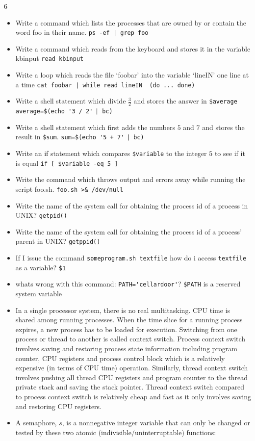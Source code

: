 \documentclass[9pt,landscape]{memoir}
\begin{document}
\begin{multicols}{6}
\begin{itemize}
    \item Write a command which lists the processes that are owned by or contain the word foo in their name. \verb$ps -ef | grep foo$
    \item Write a command which reads from the keyboard and stores it in the variable kbinput \verb$read kbinput$
    \item  Write a loop which reads the file `foobar' into the variable `lineIN' one line at a time
    \verb$cat foobar | while read lineIN  (do ... done)$
    \item Write a shell statement which divide $\frac{3}{2}$ and stores the answer in \verb|$average| \verb|average=$(echo '3 / 2'| \verb$| bc)$
    \item Write a shell statement which first adds the numbers $5$ and $7$ and stores the result in \verb|$sum|. \verb|sum=$(echo '5 + 7'| \verb$| bc)$
    \item Write an if statement which compares \verb|$variable| to the integer $5$ to see if it is equal \verb|if [ $variable -eq 5 ]|
    \item Write the command which throws output and errors away while running the script foo.sh. \verb|foo.sh >& /dev/null|
    \item Write the name of the system call for obtaining the process id of a process in UNIX? \verb$getpid()$
    \item Write the name of the system call for obtaining the process id of a process' parent in UNIX?  \verb|getppid()|
    \item If I issue the command \verb$someprogram.sh textfile$ how do i access \verb$textfile$ as a variable? \verb|$1|
    \item whats wrong with this command: \verb$PATH='cellardoor'$? \verb|$PATH| is a reserved system variable
    \item In a single processor system, there is no real multitasking. CPU time is shared among running processes. When the time slice for a running process expires, a new process has to be loaded for execution. Switching from one process or thread to another is called context switch. Process context switch involves saving and restoring process state information including program counter, CPU registers and process control block which is a relatively expensive (in terms of CPU time) operation. Similarly, thread context switch involves pushing all thread CPU registers and program counter to the thread private stack and saving the stack pointer. Thread context switch compared to process context switch is relatively cheap and fast as it only involves saving and restoring CPU registers.
    \item A semaphore, $s$, is a nonnegative integer variable that can only be changed or tested by these two atomic (indivisible/uninterruptable) functions:
\end{itemize}


\end{multicols}
\end{document}
